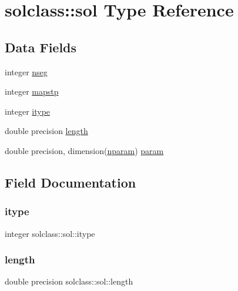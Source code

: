 \hypertarget{structsolclass_1_1sol}{}\section{solclass\+::sol Type Reference}
\label{structsolclass_1_1sol}
\subsection*{Data Fields}
\begin{DoxyCompactItemize}
\item 
integer \mbox{\hyperlink{structsolclass_1_1sol_a4e0b71eae9d2072fd83b1a4e524da7fc}{nseg}}
\item 
integer \mbox{\hyperlink{structsolclass_1_1sol_a3821a5713cb3e0e9ae5359b42644b860}{mapstp}}
\item 
integer \mbox{\hyperlink{structsolclass_1_1sol_ae34e01b972a2658f3ff55fccc3f6b99a}{itype}}
\item 
double precision \mbox{\hyperlink{structsolclass_1_1sol_a66fe4253293f305d51d6d7db753bb2c2}{length}}
\item 
double precision, dimension(\mbox{\hyperlink{namespacesolclass_abb5af39a08a5ff2cbe713621b2727eaf}{nparam}}) \mbox{\hyperlink{structsolclass_1_1sol_a70efaac352dbf744000a92effd3d814b}{param}}
\end{DoxyCompactItemize}


\subsection{Field Documentation}
\mbox{\label{structsolclass_1_1sol_ae34e01b972a2658f3ff55fccc3f6b99a}} 
\subsubsection{\texorpdfstring{itype}{itype}}
{\footnotesize\ttfamily integer solclass\+::sol\+::itype}

\mbox{\label{structsolclass_1_1sol_a66fe4253293f305d51d6d7db753bb2c2}} 
\subsubsection{\texorpdfstring{length}{length}}
{\footnotesize\ttfamily double precision solclass\+::sol\+::length}

